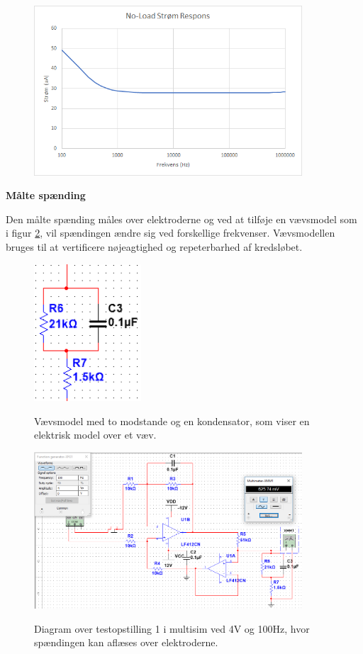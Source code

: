 \begin{figure}[H]
\centering
\includegraphics[width=10cm]{Figure/testopstilling1multisimnoloadgraf}
\label{fig:stromfrekvensoprindelig}
\end{figure}


\textbf{Målte spænding}

Den målte spænding måles over elektroderne og ved at tilføje en vævsmodel som i figur \ref{fig:testopstilling1multisimvaevs}, vil spændingen ændre sig ved forskellige frekvenser. Vævsmodellen bruges til at vertificere nøjeagtighed og repeterbarhed af kredsløbet\cite{Aroom2009}.

\begin{figure}[H]
\centering
{\includegraphics[width=4cm]
{Figure/testopstilling1multisimvaevs}}
\caption{Vævsmodel med to modstande og en kondensator, som viser en elektrisk model over et væv.}
\label{fig:testopstilling1multisimvaevs}
\end{figure}




\begin{figure}[H]
\centering
{\includegraphics[width=10cm]
{Figure/testopstilling1multisimRMS}}
\caption{Diagram over testopstilling 1 i multisim ved 4V og 100Hz, hvor spændingen kan aflæses over elektroderne.}
\label{fig:testopstilling1multisimnoload}
\end{figure}

